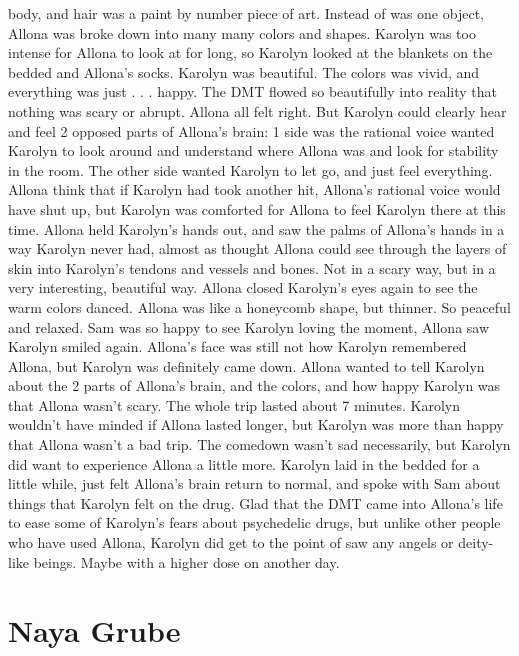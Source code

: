 \documentclass[12pt]{book}
\begin{document}
body, and hair was a paint by number piece of art. Instead of was one object, Allona was broke down into many many colors and shapes. Karolyn was too intense for Allona to look at for long, so Karolyn looked at the blankets on the bedded and Allona's socks. Karolyn was beautiful. The colors was vivid, and everything was just . . .  happy. The DMT flowed so beautifully into reality that nothing was scary or abrupt. Allona all felt right. But Karolyn could clearly hear and feel 2 opposed parts of Allona's brain: 1 side was the rational voice wanted Karolyn to look around and understand where Allona was and look for stability in the room. The other side wanted Karolyn to let go, and just feel everything. Allona think that if Karolyn had took another hit, Allona's rational voice would have shut up, but Karolyn was comforted for Allona to feel Karolyn there at this time. Allona held Karolyn's hands out, and saw the palms of Allona's hands in a way Karolyn never had, almost as thought Allona could see through the layers of skin into Karolyn's tendons and vessels and bones. Not in a scary way, but in a very interesting, beautiful way. Allona closed Karolyn's eyes again to see the warm colors danced. Allona was like a honeycomb shape, but thinner. So peaceful and relaxed. Sam was so happy to see Karolyn loving the moment, Allona saw Karolyn smiled again. Allona's face was still not how Karolyn remembered Allona, but Karolyn was definitely came down. Allona wanted to tell Karolyn about the 2 parts of Allona's brain, and the colors, and how happy Karolyn was that Allona wasn't scary. The whole trip lasted about 7 minutes. Karolyn wouldn't have minded if Allona lasted longer, but Karolyn was more than happy that Allona wasn't a bad trip. The comedown wasn't sad necessarily, but Karolyn did want to experience Allona a little more. Karolyn laid in the bedded for a little while, just felt Allona's brain return to normal, and spoke with Sam about things that Karolyn felt on the drug. Glad that the DMT came into Allona's life to ease some of Karolyn's fears about psychedelic drugs, but unlike other people who have used Allona, Karolyn did get to the point of saw any angels or deity-like beings. Maybe with a higher dose on another day.






\chapter{Naya Grube}
\end{document}
